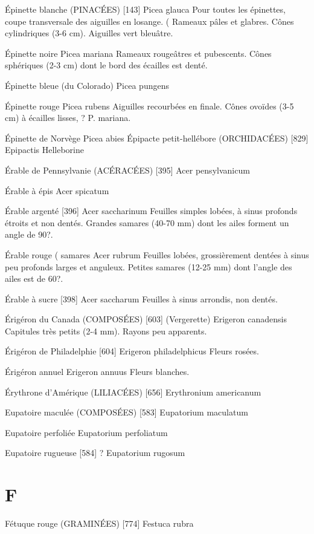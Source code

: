 \documentclass[book,12pt,a4paper,onecolumn,openany]{memoir}
\begin{document}
Épinette blanche (PINACÉES)  [143]
				Picea glauca
Pour toutes les épinettes, coupe transversale des aiguilles en losange. (
Rameaux pâles et glabres. Cônes cylindriques (3-6 cm).
Aiguilles vert bleuâtre.

Épinette noire
				Picea mariana
Rameaux rougeâtres et pubescents.
Cônes sphériques (2-3 cm) dont le bord des écailles est denté.

Épinette bleue (du Colorado)
				Picea pungens

Épinette rouge
				Picea rubens
Aiguilles recourbées en finale.
Cônes ovoïdes (3-5 cm) à écailles lisses, ? P. mariana.

Épinette de Norvège
				Picea abies
Épipacte petit-hellébore (ORCHIDACÉES)  [829]
				Epipactis Helleborine

Érable de Pennsylvanie (ACÉRACÉES)  [395]
				Acer pensylvanicum

Érable à épis
				Acer spicatum

Érable argenté  [396]
				Acer saccharinum
Feuilles simples lobées, à sinus profonds étroits et non dentés.
Grandes samares (40-70 mm) dont les ailes forment un angle de 90?.

Érable rouge							( samares
				Acer rubrum
Feuilles lobées, grossièrement dentées à sinus peu profonds larges et anguleux.
Petites samares (12-25 mm) dont l’angle des ailes est de 60?.

Érable à sucre  [398]
				Acer saccharum
Feuilles à sinus arrondis, non dentés.


Érigéron du Canada (COMPOSÉES)  [603] (Vergerette)
				Erigeron canadensis
Capitules très petits (2-4 mm). Rayons peu apparents.

Érigéron de Philadelphie  [604]
				Erigeron philadelphicus
Fleurs rosées.

Érigéron annuel
				Erigeron annuus
Fleurs blanches.

Érythrone d’Amérique (LILIACÉES)  [656]
				Erythronium americanum

Eupatoire maculée (COMPOSÉES)  [583]
				Eupatorium maculatum

Eupatoire perfoliée
				Eupatorium perfoliatum

Eupatoire rugueuse  [584]							?
				Eupatorium rugosum

\chapter*{F}

Fétuque rouge (GRAMINÉES)  [774]
				Festuca rubra
\end{document}
